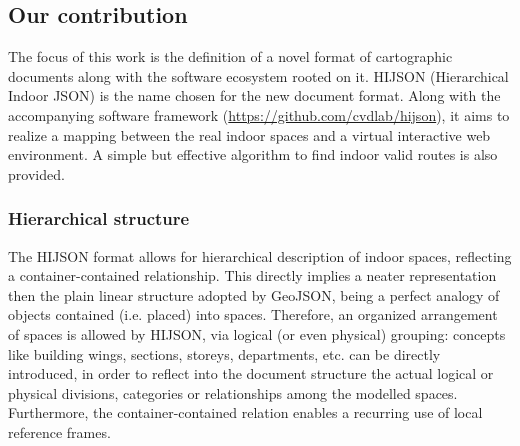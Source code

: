 \documentclass[]{egpubl}
\begin{document}
\subsection{Our contribution}

The focus of this work is the definition of a novel format of cartographic
documents along with the software ecosystem rooted on it. HIJSON (Hierarchical
Indoor JSON) is the name chosen for the new document format. Along with the
accompanying software framework (\href{https://github.com/cvdlab/hijson}{https://github.com/cvdlab/hijson}), it aims to realize a mapping between the real
indoor spaces and a virtual interactive web environment. A simple but
effective algorithm to find indoor valid routes is also provided.



\subsubsection*{Hierarchical structure}

The HIJSON format allows for hierarchical description of indoor spaces,
reflecting a container-contained relationship. This directly implies a neater
representation then the plain linear structure adopted by GeoJSON, being a
perfect analogy of objects contained (i.e. placed) into spaces. Therefore, an
organized arrangement of spaces is allowed by HIJSON, via logical (or even
physical) grouping: concepts like building wings, sections, storeys,
departments, etc. can be directly introduced, in order to reflect into the
document structure the actual logical or physical divisions, categories or
relationships among the modelled spaces. Furthermore, the container-contained
relation enables a recurring use of local reference frames.
\end{document}
